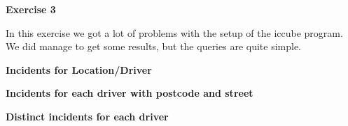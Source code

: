 {\bf \Huge Exercise 3}
\vspace{1cm}

In this exercise we got a lot of problems with the setup of the iccube program. 
We did manage to get some results, but the queries are quite simple.

\vspace{1cm }
{\Large \bf Incidents for Location/Driver}
\begin{figure}[H]
\end{figure}

\clearpage
{\Large \bf Incidents for each driver with postcode and street}
\begin{figure}[H]
\end{figure}

\clearpage
{\Large \bf  Distinct incidents for each driver}
\begin{figure}[H]
\end{figure}



